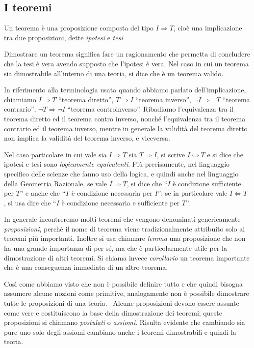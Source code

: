 {\subsection{I teoremi}

Un teorema è una proposizione composta del tipo  $I\Rightarrow T$, cioè una implicazione tra due proposizioni, dette \emph{ipotesi} e \emph{tesi} 

Dimostrare un teorema significa fare un ragionamento che permetta di concludere che la tesi è vera avendo supposto che l’ipotesi è vera. Nel caso in cui un teorema sia dimostrabile all'interno di una teoria, si dice che è un teorema valido.

In riferimento alla terminologia usata quando abbiamo parlato dell'implicazione, chiamiamo  $I\Rightarrow T$ “teorema diretto”,  $T\Rightarrow I$ “teorema inverso”, $\neg I\Rightarrow \neg T$ “teorema contrario”,  $\neg T\Rightarrow \neg I$  “teorema controinverso”. Ribadiamo l'equivalenza tra il teorema diretto ed il teorema contro inverso, nonché l'equivalenza tra il teorema contrario ed il teorema inverso, mentre in generale la validità del teorema diretto non implica la validità del teorema inverso, e viceversa.

Nel caso particolare in cui vale sia  $I\Rightarrow T$  sia  $T\Rightarrow I$, si scrive  $I\Leftrightarrow T$ e si dice che ipotesi e tesi sono \emph{logicamente equivalenti}. Più precisamente, nel linguaggio specifico delle scienze che fanno uso della logica, e quindi anche nel linguaggio della Geometria Razionale, se vale  $I\Rightarrow T$, si dice che “$ I $ è condizione sufficiente per $ T $” e anche che “$ T $ è condizione necessaria per $ I $”; se in particolare vale  $I\Leftrightarrow T$ , si usa dire che “$ I $ è condizione necessaria e sufficiente per $ T $”.

In generale incontreremo molti teoremi che vengono denominati genericamente \emph{proposizioni}, perché il nome di teorema viene tradizionalmente attribuito solo ai teoremi più importanti. Inoltre si usa chiamare \emph{lemma} una proposizione che non ha una grande importanza di per sé, ma che è particolarmente utile per la dimostrazione di altri teoremi. Si chiama invece \emph{corollario} un teorema importante che è una conseguenza immediata di un altro teorema.

Così come abbiamo visto che non è possibile definire tutto e che quindi bisogna assumere alcune nozioni come primitive, analogamente non è possibile dimostrare tutte le proposizioni di una teoria. \ Alcune proposizioni devono essere assunte come vere e costituiscono la base della dimostrazione dei teoremi; queste proposizioni si chiamano \emph{postulati} o \emph{assiomi}. Risulta evidente che cambiando sia pure uno solo degli assiomi cambiano anche i teoremi dimostrabili e quindi la teoria.

}
